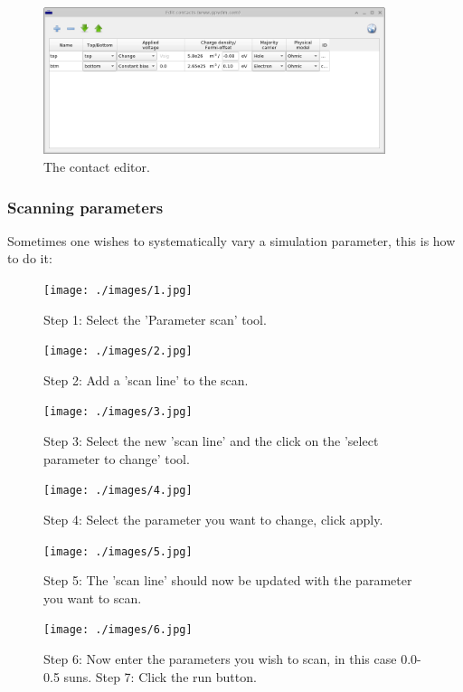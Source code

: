 \documentclass[11pt]{article}
\begin{document}
\begin{figure}[ht!]
\centering
\includegraphics[width=100mm]{./images/contact_editor.png}
{\caption{The contact editor.}}
\label{fig:contact_editor}
\end{figure}



\subsubsection{Scanning parameters}
Sometimes one wishes to systematically vary a simulation parameter, this is how to do it:




\begin{figure}[ht!]
\centering
\texttt{[image: ./images/1.jpg]}
{\caption*{Step 1: Select the 'Parameter scan' tool.}}
\label{overflow}
\end{figure}


\begin{figure}[ht!]
\centering
\texttt{[image: ./images/2.jpg]}
\caption*{Step 2: Add a 'scan line' to the scan.}
\end{figure}

\begin{figure}[ht!]
\centering
\texttt{[image: ./images/3.jpg]}
\caption*{Step 3: Select the new 'scan line' and the click on the 'select parameter to change' tool.}
\label{overflow}
\end{figure}


\begin{figure}[ht!]
\centering
\texttt{[image: ./images/4.jpg]}
\caption*{Step 4: Select the parameter you want to change, click apply.}
\end{figure}


\begin{figure}[ht!]
\centering
\texttt{[image: ./images/5.jpg]}
\caption*{Step 5: The 'scan line' should now be updated with the parameter you want to scan.}
\end{figure}


\begin{figure}[ht!]
\centering
\texttt{[image: ./images/6.jpg]}
\caption*{Step 6: Now enter the parameters you wish to scan, in this case 0.0-0.5 suns.
Step 7: Click the run button.}
\end{figure}
\end{document}
